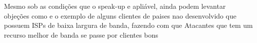 \documentclass[a4paper,12pt]{article}
\begin{document}
 \vspace{0.5cm}
 
 Mesmo sob as condições que o speak-up e apliável, ainda podem levantar objeções como e o exemplo de alguns clientes de paises nao desenvolvido que possuem ISPs de baixa largura de banda, fazendo com que Atacantes que tem um recurso melhor de banda se passe por clientes bons 
 
\vspace{4cm}

\begin{center}
\end{center}

 
\end{document}
